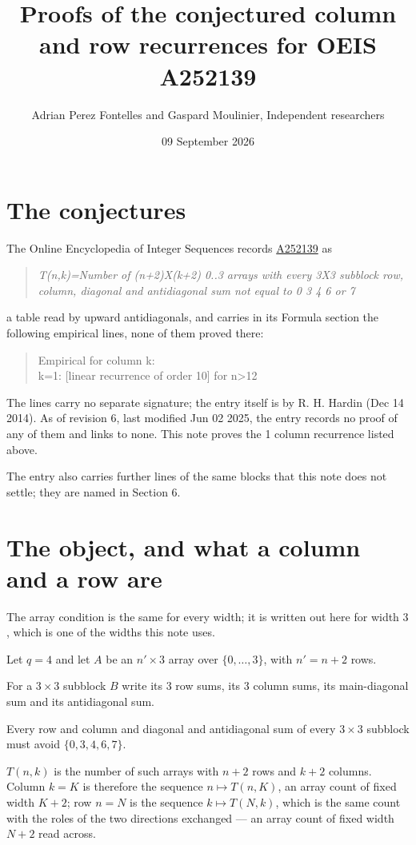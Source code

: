 \documentclass[11pt]{article}
\title{Proofs of the conjectured column and row recurrences for OEIS A252139}
\author{Adrian Perez Fontelles and Gaspard Moulinier, Independent researchers}
\date{09 September 2026}
\theoremstyle{definition}
\begin{document}
\maketitle
\section{The conjectures}

The Online Encyclopedia of Integer Sequences records \href{https://oeis.org/A252139}{A252139} as

\begin{quote}\itshape T(n,k)=Number of (n+2)X(k+2) 0..3 arrays with every 3X3 subblock row, column, diagonal and antidiagonal sum not equal to 0 3 4 6 or 7\end{quote}

a table read by upward antidiagonals, and carries in its Formula section the following empirical lines, none of them proved there:

\begin{quote}\ttfamily Empirical for column k:\\
k=1: [linear recurrence of order 10] for n>12\end{quote}

The lines carry no separate signature; the entry itself is by R. H. Hardin (Dec 14 2014). As of revision 6, last modified Jun 02 2025, the entry records no proof of any of them and links to none. This note proves the 1 column recurrence listed above.

The entry also carries further lines of the same blocks that this note does not settle; they are named in Section 6.

\section{The object, and what a column and a row are}

The array condition is the same for every width; it is written out here for width $3$, which is one of the widths this note uses.

Let $q = 4$ and let $A$ be an $n' \times 3$ array over $\{0,\dots,3\}$, with $n' = n + 2$ rows.

For a $3\times3$ subblock $B$ write its 3 row sums, its 3 column sums, its main-diagonal sum and its antidiagonal sum.

Every row and column and diagonal and antidiagonal sum of every $3\times3$ subblock must avoid $\{0, 3, 4, 6, 7\}$.

$T(n,k)$ is the number of such arrays with $n + 2$ rows and $k + 2$ columns. Column $k = K$ is therefore the sequence $n \mapsto T(n,K)$, an array count of fixed width $K + 2$; row $n = N$ is the sequence $k \mapsto T(N,k)$, which is the same count with the roles of the two directions exchanged --- an array count of fixed width $N + 2$ read across.
\end{document}
